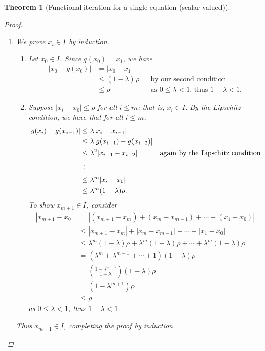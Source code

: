 \documentclass[12pt,letterpaper,DIV=11]{scrartcl}
\theoremstyle{plain}
\newtheorem{theorem}{Theorem}[section]
\theoremstyle{definition}
\theoremstyle{remark}
\begin{document}
\begin{theorem}[Functional iteration for a single equation (scalar valued)]
  \begin{proof}\leavevmode
    \begin{enumerate}
      \item We prove $x_i \in I$ by induction.
        \begin{enumerate}
          \item Let $x_0 \in I$.
            Since $g(x_0) = x_1$, we have \begin{align*}
              |x_0 - g(x_0)| &= |x_0 - x_1| \\
                             &\leq (1 - \lambda) \rho && \text{by our second condition} \\
                             &\leq \rho && \text{as $0 \leq \lambda < 1$, thus $1 - \lambda < 1$.}
            \end{align*}
          \item Suppose $|x_i - x_0| \leq \rho$ for all $i \leq m$; that is, $x_i \in I$.
            By the Lipschitz condition, we have that for all $i \leq m$, \begin{align*}
              |g(x_i) - g(x_{i - 1})| &\leq \lambda |x_i - x_{i - 1}| \\
                                      &\leq \lambda |g(x_{i - 1}) - g(x_{i - 2})| \\
                                      &\leq \lambda^2 |x_{i - 1} - x_{i - 2}| && \text{again by the Lipschitz condition} \\
                                      &\vdotswithin{\leq} \\
                                      &\leq \lambda^m |x_i - x_0| \\
                                      &\leq \lambda^m (1 - \lambda) \rho.
            \end{align*}
            To show $x_{m + 1} \in I$, consider \begin{align*}
              |x_{m + 1} - x_0| &= |(x_{m + 1} - x_m) + (x_m - x_{m - 1}) + \cdots + (x_1 - x_0)| \\
                                &\leq |x_{m + 1} - x_m| + |x_m - x_{m - 1}| + \cdots + |x_1 - x_0| \\
                                &\leq \lambda^m (1 - \lambda) \rho + \lambda^m (1 - \lambda) \rho + \cdots + \lambda^m (1 - \lambda) \rho \\
                                &= (\lambda^m + \lambda^{m - 1} + \cdots + 1) (1 - \lambda) \rho \\
                                &= \left( \frac{1 - \lambda^{m + 1}}{1 - \lambda} \right) (1 - \lambda) \rho \\
                                &= \left( 1 - \lambda^{m + 1} \right) \rho \\
                                &\leq \rho
            \end{align*} as $0 \leq \lambda < 1$, thus $1 - \lambda < 1$.
        \end{enumerate}
        Thus $x_{m + 1} \in I$, completing the proof by induction.


\end{enumerate}
\end{proof}
\end{theorem}
\end{document}

